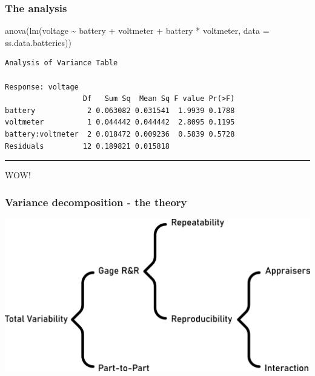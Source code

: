 \documentclass[
  a4paper,
]{scrbook}
\newenvironment{Shaded}{\begin{snugshade}}{\end{snugshade}}
\newcommand{\AttributeTok}[1]{\textcolor[rgb]{0.40,0.45,0.13}{#1}}
\newcommand{\FunctionTok}[1]{\textcolor[rgb]{0.28,0.35,0.67}{#1}}
\newcommand{\NormalTok}[1]{\textcolor[rgb]{0.00,0.23,0.31}{#1}}
\newcommand{\SpecialCharTok}[1]{\textcolor[rgb]{0.37,0.37,0.37}{#1}}
\begin{document}
\subsubsection{The analysis}\label{the-analysis}

\begin{Shaded}
\begin{Highlighting}[]
\FunctionTok{anova}\NormalTok{(}\FunctionTok{lm}\NormalTok{(voltage }\SpecialCharTok{\textasciitilde{}}\NormalTok{ battery }\SpecialCharTok{+}\NormalTok{ voltmeter }\SpecialCharTok{+}\NormalTok{ battery }\SpecialCharTok{*}\NormalTok{ voltmeter, }
         \AttributeTok{data =}\NormalTok{ ss.data.batteries))}
\end{Highlighting}
\end{Shaded}

\begin{verbatim}
Analysis of Variance Table

Response: voltage
                  Df   Sum Sq  Mean Sq F value Pr(>F)
battery            2 0.063082 0.031541  1.9939 0.1788
voltmeter          1 0.044442 0.044442  2.8095 0.1195
battery:voltmeter  2 0.018472 0.009236  0.5839 0.5728
Residuals         12 0.189821 0.015818               
\end{verbatim}

\begin{center}\rule{0.5\linewidth}{0.5pt}\end{center}

WOW!

\subsubsection{Variance decomposition - the
theory}\label{variance-decomposition---the-theory}

\includegraphics[width=0.95\linewidth,height=\textheight,keepaspectratio]{chapter004/gage_rr.png}
\end{document}
